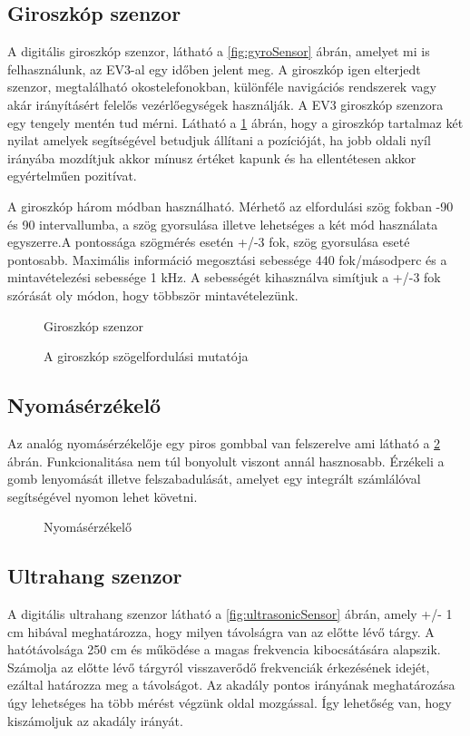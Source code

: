\subsection{Giroszkóp szenzor}

A digitális giroszkóp szenzor, látható a \ref{fig:gyroSensor} ábrán, amelyet mi is felhasználunk, az EV3-al egy időben jelent meg. A giroszkóp igen elterjedt szenzor, megtalálható okostelefonokban, különféle navigációs rendszerek vagy akár irányításért felelős vezérlőegységek használják. A EV3 giroszkóp szenzora egy tengely mentén tud mérni. Látható a \ref{fig:gyroFok} ábrán, hogy a giroszkóp tartalmaz két nyilat amelyek segítségével betudjuk állítani a pozícióját, ha jobb oldali nyíl irányába mozdítjuk akkor mínusz értéket kapunk és ha ellentétesen akkor egyértelműen pozitívat. 

A giroszkóp három módban használható. Mérhető az elfordulási szög fokban -90 és 90 intervallumba, a szög gyorsulása illetve lehetséges a két mód használata egyszerre.A pontossága szögmérés esetén +/-3 fok, szög gyorsulása eseté pontosabb. Maximális információ megosztási sebessége 440 fok/másodperc és a mintavételezési sebessége 1 kHz. A sebességét kihasználva simítjuk  a +/-3 fok szórását oly módon, hogy többször mintavételezünk.

\begin{figure}[!htb]
	\centering
	\label{fig:gyroSensor}
	\caption{Giroszkóp szenzor}
	\endminipage
	\label{fig:gyroFok}
	\caption{A giroszkóp szögelfordulási mutatója}
	\endminipage
\end{figure}

\subsection{Nyomásérzékelő}
Az analóg nyomásérzékelője egy piros gombbal van felszerelve ami látható a \ref{fig:touchSensor} ábrán. Funkcionalitása nem túl bonyolult viszont annál hasznosabb. Érzékeli a gomb lenyomását illetve felszabadulását, amelyet egy integrált számlálóval segítségével nyomon lehet követni. 

\begin{figure}[!htb]
	\label{fig:touchSensor}
	\centering
	\caption{Nyomásérzékelő}
\end{figure}

\subsection{Ultrahang szenzor}
A digitális ultrahang szenzor látható a \ref{fig:ultrasonicSensor} ábrán, amely +/- 1 cm hibával meghatározza, hogy milyen távolságra van az előtte lévő tárgy. A hatótávolsága 250 cm és működése a magas frekvencia kibocsátására  alapszik. Számolja az előtte lévő tárgyról visszaverődő frekvenciák érkezésének idejét, ezáltal határozza meg a távolságot. Az akadály pontos irányának meghatározása úgy lehetséges ha több mérést végzünk oldal mozgással. Így lehetőség van, hogy kiszámoljuk az akadály irányát.


